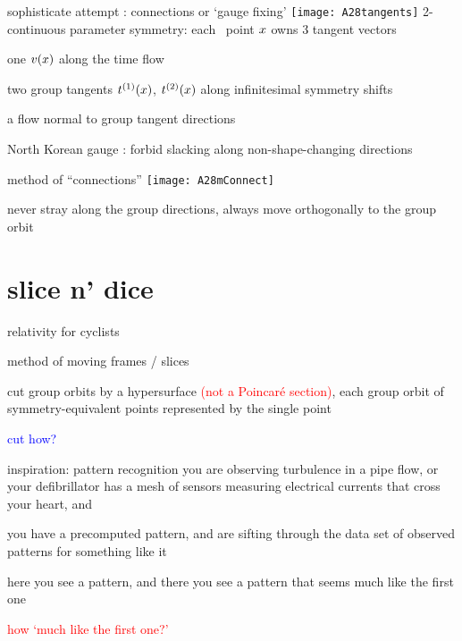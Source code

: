 \begin{frame}{sophisticate attempt : connections or `gauge fixing'}
\texttt{[image: A28tangents]}
2-continuous parameter symmetry: each \statesp\ point
$x$ owns 3 tangent vectors

one $v(x)$ along the time flow

two group tangents $t^{(1)}(x)$, $t^{(2)}(x)$
along infinitesimal symmetry shifts

\begin{block}{a flow }
normal to group tangent directions
\end{block}

North Korean gauge : forbid slacking along non-shape-changing directions
\end{frame}

\begin{frame}{method of ``connections''}
\texttt{[image: A28mConnect]}

never stray along the group directions, always move orthogonally to
the group orbit
\end{frame}


\section[slice n' dice]{slice n' dice}


\begin{frame}{relativity for cyclists}
\begin{block}{method of moving frames / slices}

\bigskip
cut group orbits by a hypersurface
\textcolor{red}{(not a Poincar\'e section)}, each group orbit of
symmetry-equivalent points represented by the single point
\end{block}
\bigskip
\textcolor{blue}{\Large cut how?}
\end{frame}


\begin{frame}{inspiration: pattern recognition}
you are observing turbulence in a pipe flow, or your defibrillator has a
mesh of sensors measuring electrical currents that cross your heart, and

\medskip

you have a precomputed pattern, and are sifting through the data set of
observed patterns for something like it

\medskip

here you see a pattern, and there you see a pattern that seems much like
the first one

\bigskip

\bigskip

\textcolor{red}{\Large how `much like the first one?'}
\end{frame}


